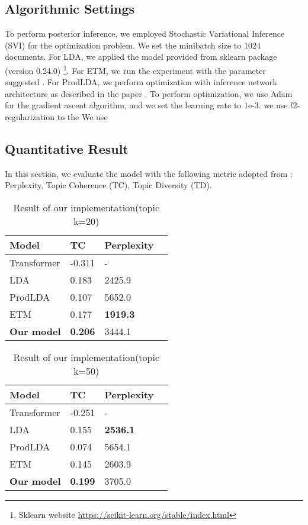 \subsection{Algorithmic Settings}
To perform posterior inference, we employed Stochastic Variational Inference (SVI) \cite{hoffman_stochastic_2013} for the optimization problem. We set the minibatch size to 1024 documents.
For LDA, we applied the model provided from sklearn package (version 0.24.0) \footnote{Sklearn website \url{https://scikit-learn.org/stable/index.html}}. For ETM, we run the experiment with the parameter suggested \cite{dieng_topic_2019}. For ProdLDA, we perform optimization with inference network architecture as described in the paper \cite{srivastava_autoencoding_2017}. 
To perform optimization, we use Adam for the gradient ascent algorithm, and we set the learning rate to 1e-3.
we use $ l2 $-regularization to the 
We use 

% 
\subsection{Quantitative Result}
In this section, we evaluate the model with the following metric adopted from \cite{dieng_dynamic_2019}: Perplexity, Topic Coherence (TC), Topic Diversity (TD). %
\begin{table}[h]
\centering
\begin{tabular}{llll}
\hline
Model      & TC     & Perplexity  \\ \hline
Transformer & -0.311 & - \\
LDA & 0.183 & 2425.9 \\
ProdLDA		&  0.107 & 5652.0\\
ETM	     	&  0.177 & \textbf{1919.3}\\
\textbf{Our model}  & \textbf{0.206} & 3444.1 \\ \hline
\end{tabular}
\label{tbl:t1}
\caption{Result of our implementation(topic k=20)}
\end{table}
\begin{table}[h]
\centering
\begin{tabular}{llll}
\hline
Model      & TC     & Perplexity  \\ \hline
Transformer & -0.251 & - \\
LDA & 0.155 & \textbf{2536.1} \\
ProdLDA		&  0.074 & 5654.1\\
ETM	     	&  0.145 & 2603.9\\
\textbf{Our model}  & \textbf{0.199} & 3705.0 \\ \hline
\end{tabular}
\label{tbl:t2}
\caption{Result of our implementation(topic k=50)}
\end{table}
